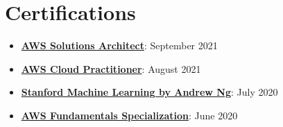 \documentclass[letterpaper,11pt]{article}
\newcommand{\resumeItem}[2]{
  \item\small{
    \textbf{#1}{: #2 \vspace{-2pt}}
  }
}
\newcommand{\resumeSubHeadingListStart}{\begin{itemize}[leftmargin=*]}
\newcommand{\resumeSubHeadingListEnd}{\end{itemize}}
\begin{document}
\section{Certifications}
 \resumeSubHeadingListStart
   \resumeItem{\href{https://www.credly.com/badges/ef46fdf4-2c55-474d-a963-9ee14107160f}{AWS Solutions Architect}}
   {September 2021}
   \resumeItem{\href{https://www.credly.com/badges/c8d7f47f-c6c1-4af9-8391-5b509b92b271}{AWS Cloud Practitioner}}
     {August 2021}
   \resumeItem{\href{https://coursera.org/share/29802cca497e8680b26b241d0ef50b59}{Stanford Machine Learning by Andrew Ng}}
     {July 2020}
   \resumeItem{\href{https://coursera.org/share/daef661212dab251985d69e4fb71f730}{AWS Fundamentals Specialization}}
     {June 2020}
 \resumeSubHeadingListEnd

\end{document}
